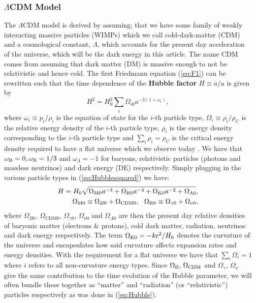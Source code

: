\documentclass[%
reprint,
 amsmath,amssymb,
 aps,
]{revtex4-2}
\begin{document}
\subsubsection{$\Lambda$CDM Model}
The $\Lambda$CDM model is derived by assuming; that we have some family of weakly interacting massive particles (WIMPs) which we call cold-dark-matter (CDM) and a cosmological constant, $\Lambda$, which accounts for the present day acceleration of the universe, which will be the dark energy in this article. The name CDM comes from assuming that dark matter (DM) is massive enough to not be relativistic and hence cold. 
The first Friedmann equation (\ref{eq:F1}) can be rewritten such that the time dependence of the \textbf{Hubble factor} $H\equiv\dot{a}/a$ is given by
\begin{equation}
	H^2=H_0^2\sum_i\Omega_{i0}a^{-3(1+\omega_i)},
	\label{eq:Hubblesquared}
\end{equation}
where $\omega_i\equiv p_i/\rho_i$ is the equation of state for the $i$-th particle type, $\Omega_i\equiv\rho_i/\rho_C$ is the relative energy density of the $i$-th particle type, $\rho_i$ is the energy density corresponding to the $i$-th particle type and $\sum_i\rho_i=\rho_C$ is the critical energy density required to have a flat universe which we observe today \cite{Planck:2018vyg}. We have that $\omega_{\text B}=0,\omega_{\text{R}}=1/3$ and $\omega_\Lambda=-1$ for baryons, relativistic particles (photons and massless neutrinos) and dark energy (DE) respectively. Simply plugging in the various particle types in (\ref{eq:Hubblesquared}) we have:
\begin{align}
	H=H_0\sqrt{\Omega_{\text M0}a^{-3}+\Omega_{\text{R}0}a^{-4}+\Omega_{\text K0}a^{-2}+\Omega_{\Lambda0}}, 
	\label{eq:Hubble}\\
	\Omega_{\text M0}\equiv \Omega_{B0}+\Omega_{\text{CDM}0},~~\Omega_{\text{R}0}\equiv \Omega_{\gamma0}+\Omega_{\nu0},\nonumber
\end{align}
where $\Omega_{B0},\,\Omega_{\text{CDM}0},\,\Omega_{\gamma0},\,\Omega_{\nu0}$ and $\Omega_{\Lambda0}$ are then the present day relative densities of baryonic matter (electrons \& protons), cold dark matter, radiation, neutrinos and dark energy respectively. The term $\Omega_{\text K0}=-kc^2/H_0$ denotes the curvature of the universe and encapsulates how said curvature affects expansion rates and energy densities. With the requirement for a flat universe we have that $\sum_i\Omega_i=1$ where $i$ refers to all non-curvature energy types. Since $\Omega_{\text B},\,\Omega_{\text{CDM}}$ and $\Omega_\gamma,\,\Omega_\nu$ give the same contribution to the time evolution of the Hubble parameter, we will often bundle these together as ``matter'' and ``radiation'' (or ``relativistic'') particles respectively as was done in (\ref{eq:Hubble}).
\end{document}
